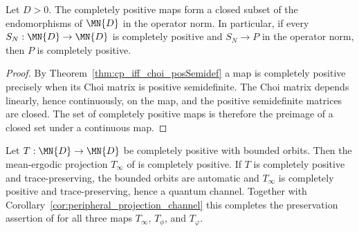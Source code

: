 \begin{lemma}
    \label{lem:cp_maps_closed}
    \leanok
    Let $D>0$. The completely positive maps form a closed subset of the
    endomorphisms of $\MN{D}$ in the operator norm. In particular, if every
    $S_N:\MN{D}\to\MN{D}$ is completely positive and $S_N\to P$ in the
    operator norm, then $P$ is completely positive.
\end{lemma}

\begin{proof}\leanok
    By Theorem~\ref{thm:cp_iff_choi_posSemidef} a map is completely positive
    precisely when its Choi matrix is positive semidefinite. The Choi matrix
    depends linearly, hence continuously, on the map, and the positive
    semidefinite matrices are closed. The set of completely positive maps is
    therefore the preimage of a closed set under a continuous map.
\end{proof}

\begin{corollary}
    \label{cor:mean_ergodic_projection_channel}
    \leanok
    Let $T:\MN{D}\to\MN{D}$ be completely positive with bounded orbits. Then
    the mean-ergodic projection $T_\infty$ of
    \cite[Equation~(6.14)]{Wolf2012Quantum} is completely positive. If $T$ is
    completely positive and trace-preserving, the bounded orbits are automatic
    and $T_\infty$ is completely positive and trace-preserving, hence a
    quantum channel. Together with
    Corollary~\ref{cor:peripheral_projection_channel} this completes the
    preservation assertion of \cite[Proposition~6.3]{Wolf2012Quantum} for all
    three maps $T_\infty$, $T_\phi$, and $T_\varphi$.
\end{corollary}

